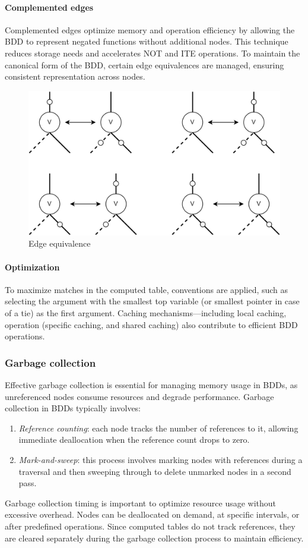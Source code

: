 \paragraph*{Complemented edges}
Complemented edges optimize memory and operation efficiency by allowing the BDD to represent negated functions without additional nodes.
This technique reduces storage needs and accelerates NOT and ITE operations.
To maintain the canonical form of the BDD, certain edge equivalences are managed, ensuring consistent representation across nodes.
\begin{figure}[H]
    \centering
    \includegraphics[width=0.75\linewidth]{images/ed1.png}
    \caption{Edge equivalence}
\end{figure}

\paragraph*{Optimization}
To maximize matches in the computed table, conventions are applied, such as selecting the argument with the smallest top variable (or smallest pointer in case of a tie) as the first argument. 
Caching mechanisms—including local caching, operation (specific caching, and shared caching) also contribute to efficient BDD operations.

\subsubsection{Garbage collection}
Effective garbage collection is essential for managing memory usage in BDDs, as unreferenced nodes consume resources and degrade performance. 
Garbage collection in BDDs typically involves:
\begin{enumerate}
    \item \textit{Reference counting}: each node tracks the number of references to it, allowing immediate deallocation when the reference count drops to zero.
    \item \textit{Mark-and-sweep}: this process involves marking nodes with references during a traversal and then sweeping through to delete unmarked nodes in a second pass.
\end{enumerate}
Garbage collection timing is important to optimize resource usage without excessive overhead. 
Nodes can be deallocated on demand, at specific intervals, or after predefined operations. 
Since computed tables do not track references, they are cleared separately during the garbage collection process to maintain efficiency.